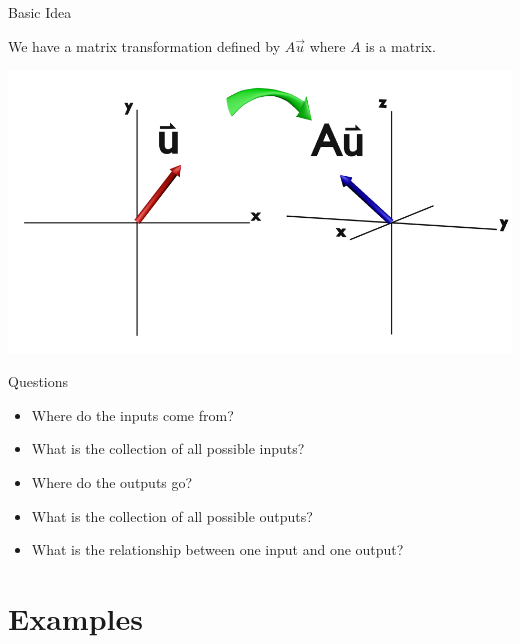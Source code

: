 \documentclass[svgnames,table,,aspectratio=169]{beamer}
\begin{document}
\begin{frame}{Basic Idea}

  We have a matrix transformation defined by $A\vec{u}$ where $A$ is a
  matrix.

  \center
  \includegraphics[height=0.8\textheight]{transofrmationOneVector}
  
\end{frame}

\begin{frame}{Questions}

  \begin{itemize}
  \item Where do the inputs come from?
  \item What is the collection of all possible inputs?
  \item Where do the outputs go?
  \item What is the collection of all possible outputs?
  \item What is the relationship between one input and one output?
  \end{itemize}
  
\end{frame}

\section{Examples}
\end{document}
